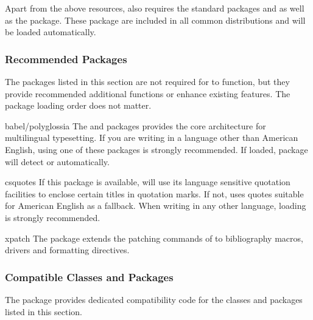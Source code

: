 \documentclass{ltxdockit}[2011/03/25]
\begin{document}
Apart from the above resources,  also requires the standard \latex packages  and  as well as the  package. These package are included in all common \tex distributions and will be loaded automatically.

\subsubsection{Recommended Packages}
\label{int:pre:rec}

The packages listed in this section are not required for  to function, but they provide recommended additional functions or enhance existing features. The package loading order does not matter.

\begin{marglist}

\item[babel/polyglossia]
The  and  packages provides the core architecture for multilingual typesetting. If you are writing in a language other than American English, using one of these packages is strongly recommended. If loaded,  package will detect  or  automatically.

\item[csquotes]
If this package is available,  will use its language sensitive quotation facilities to enclose certain titles in quotation marks. If not,  uses quotes suitable for American English as a fallback. When writing in any other language, loading  is strongly recommended.

\item[xpatch]
The  package extends the patching commands of  to  bibliography macros, drivers and formatting directives.

\end{marglist}

\subsubsection{Compatible Classes and Packages}
\label{int:pre:cmp}

The  package provides dedicated compatibility code for the classes and packages listed in this section.
\end{document}

